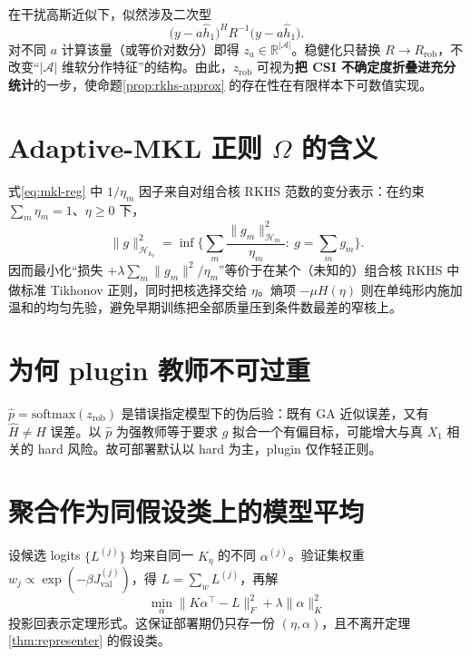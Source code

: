 在干扰高斯近似下，似然涉及二次型
\begin{equation}
\big(y-a\hat h_1\big)^H R^{-1}\big(y-a\hat h_1\big).
\end{equation}
对不同 $a$ 计算该量（或等价对数分）即得 $z_a\in\mathbb{R}^{|\mathcal{A}|}$。稳健化只替换 $R\to R_{\mathrm{rob}}$，不改变“$|\mathcal{A}|$ 维软分作特征”的结构。由此，$z_{\mathrm{rob}}$ 可视为\textbf{把 CSI 不确定度折叠进充分统计}的一步，使命题\ref{prop:rkhs-approx} 的存在性在有限样本下可数值实现。

\section{Adaptive-MKL 正则 $\Omega$ 的含义}

式\eqref{eq:mkl-reg} 中 $1/\eta_m$ 因子来自对组合核 RKHS 范数的变分表示：在约束 $\sum_m\eta_m=1$、$\eta\ge 0$ 下，
\begin{equation}
\|g\|_{\mathcal{H}_{k_\eta}}^2
=\inf\Big\{
\sum_m\frac{\|g_m\|_{\mathcal{H}_m}^2}{\eta_m}
:\ g=\sum_m g_m
\Big\}.
\end{equation}
因而最小化“损失 $+\lambda\sum_m\|g_m\|^2/\eta_m$”等价于在某个（未知的）组合核 RKHS 中做标准 Tikhonov 正则，同时把核选择交给 $\eta$。熵项 $-\mu H(\eta)$ 则在单纯形内施加温和的均匀先验，避免早期训练把全部质量压到条件数最差的窄核上。

\section{为何 plugin 教师不可过重}

$\hat p=\mathrm{softmax}(z_{\mathrm{rob}})$ 是错误指定模型下的伪后验：既有 GA 近似误差，又有 $\hat H\neq H$ 误差。以 $\hat p$ 为强教师等于要求 $g$ 拟合一个有偏目标，可能增大与真 $X_1$ 相关的 hard 风险。故可部署默认以 hard 为主，plugin 仅作轻正则。

\section{聚合作为同假设类上的模型平均}

设候选 logits $\{L^{(j)}\}$ 均来自同一 $K_\eta$ 的不同 $\alpha^{(j)}$。验证集权重 $w_j\propto \exp(-\beta J_{\mathrm{val}}^{(j)})$，得 $L=\sum_w L^{(j)}$，再解
\begin{equation}
\min_\alpha \|K\alpha^\top-L\|_F^2+\lambda\|\alpha\|^2_K
\end{equation}
投影回表示定理形式。这保证部署期仍只存一份 $(\eta,\alpha)$，且不离开定理\ref{thm:representer} 的假设类。

